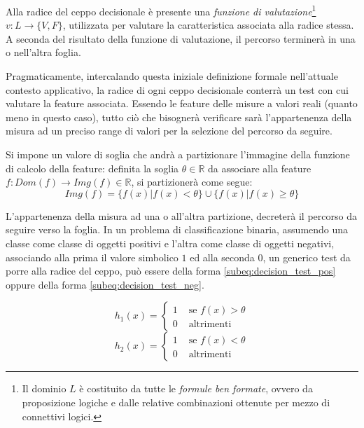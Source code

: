 
            Alla radice del ceppo decisionale è presente una \emph{funzione di valutazione}\footnote{Il dominio $L$ è costituito da tutte le \emph{formule ben formate}, ovvero da proposizione logiche e dalle relative combinazioni ottenute per mezzo di connettivi logici.} $v:L \rightarrow \{V, F\}$, utilizzata per valutare la caratteristica associata alla radice stessa.
            A seconda del risultato della funzione di valutazione, il percorso terminerà in una o nell'altra foglia.

            Pragmaticamente, intercalando questa iniziale definizione formale nell'attuale contesto applicativo, la radice di ogni ceppo decisionale conterrà un test con cui valutare la feature associata.
            Essendo le feature delle misure a valori reali (quanto meno in questo caso), tutto ciò che bisognerà verificare sarà l'appartenenza della misura ad un preciso range di valori per la selezione del percorso da seguire.

            Si impone un valore di soglia che andrà a partizionare l'immagine della funzione di calcolo della feature: definita la soglia $\theta \in \mathbb{R}$ da associare alla feature $f:Dom(f) \rightarrow Img(f) \in \mathbb{R}$, si partizionerà come segue:
            $$Img(f) = \{f(x)|f(x) < \theta\} \cup \{f(x) | f(x) \geq \theta\}$$

            L'appartenenza della misura ad una o all'altra partizione, decreterà il percorso da seguire verso la foglia.
            In un problema di classificazione binaria, assumendo una classe come classe di oggetti positivi e l'altra come classe di oggetti negativi, associando alla prima il valore simbolico $1$ ed alla seconda $0$, un generico test da porre alla radice del ceppo, può essere della forma \ref{subeq:decision_test_pos} oppure della forma \ref{subeq:decision_test_neg}.

            \begin{equation}
                \label{subeq:decision_test_pos}
                h_1(x) =
                \begin{cases}
                    1 & \text{ se } f(x) > \theta \\
                    0 & \text{ altrimenti }
                \end{cases}
            \end{equation}
            \begin{equation}
                \label{subeq:decision_test_neg}
                h_2(x) = 
                \begin{cases}
                    1 & \text{ se } f(x) < \theta \\
                    0 & \text{ altrimenti }
                \end{cases}
            \end{equation}

